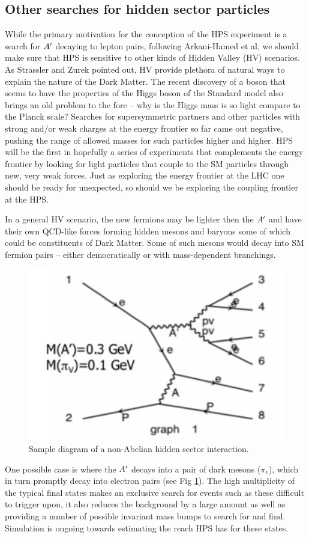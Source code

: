 \subsection{Other searches for hidden sector particles}


While the primary motivation for the conception of the HPS experiment is a search for $A^\prime$ decaying to lepton pairs, following Arkani-Hamed et al, we should make sure that HPS is sensitive to other kinds of Hidden Valley (HV) scenarios. As Strassler and Zurek pointed out, HV provide plethora of natural ways to explain the nature of the Dark Matter. The recent discovery of a boson that seems to have the properties of the Higgs boson of the Standard model also brings an old problem to the fore – why is the Higgs mass is so light compare to the Planck scale? Searches for supersymmetric partners and other particles with strong and/or weak charges at the energy frontier so far came out negative, pushing the range of allowed masses for such particles higher and higher. HPS will be the first in hopefully a series of experiments that complements the energy frontier by looking for light particles that couple to the SM particles through new, very weak forces. Just as exploring the energy frontier at the LHC one should be ready for unexpected, so should we be exploring the coupling frontier at the HPS.

In a general HV scenario, the new fermions may be lighter then the $A^\prime$ and have their own QCD-like forces forming hidden mesons and baryons some of which could be constituents of Dark Matter. Some of such mesons would decay into SM fermion pairs – either democratically or with mass-dependent branchings. 
\begin{figure}
\includegraphics[scale=1]{measurements/multilepton-diagram.pdf}
\caption{Sample diagram of a non-Abelian hidden sector interaction.}
\label{fig:mldiagram}
\end{figure}
One possible  case is where the $A^\prime$ decays into a pair of dark mesons ($\pi_v$), which in turn promptly decay into electron pairs (see Fig \ref{fig:mldiagram}).  The high multiplicity of the typical final states makes an exclusive search for events such as these  difficult to trigger upon, it also reduces the background by a large amount as well as providing a number of possible invariant mass bumps to search for and find.  Simulation is ongoing towards estimating the reach HPS has for these states.  


